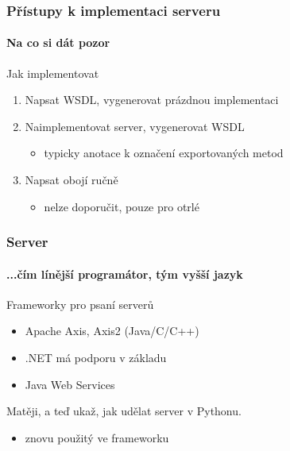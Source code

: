 \documentclass[12pt]{beamer}
\begin{document}
\begin{frame}
  \frametitle{Přístupy k implementaci serveru}
  \framesubtitle{Na co si dát pozor}

  \begin{block}{Jak implementovat}
    \begin{enumerate}
      \item Napsat WSDL, vygenerovat prázdnou implementaci
      \vspace{4mm}

      \item Naimplementovat server, vygenerovat WSDL
      \begin{itemize}
        \item typicky anotace k označení exportovaných metod
      \end{itemize}
      \vspace{4mm}

      \item Napsat obojí ručně
      \begin{itemize}
        \item \alert{nelze doporučit}, pouze pro otrlé
      \end{itemize}
    \end{enumerate}
  \end{block}
\end{frame}

\begin{frame}
  \frametitle{Server}
  \framesubtitle{...čím línější programátor, tým vyšší jazyk}

  \begin{block}{Frameworky pro psaní serverů}
    \begin{itemize}
      \item Apache Axis, Axis2 (Java/C/C++)
      \item .NET má podporu v základu
      \item Java Web Services
    \end{itemize}
  \end{block}

  \begin{example}
    Matěji, a teď ukaž, jak udělat server v Pythonu.
    \begin{itemize}
      \item znovu  použitý ve frameworku 
    \end{itemize}
  \end{example}
\end{frame}
\end{document}
